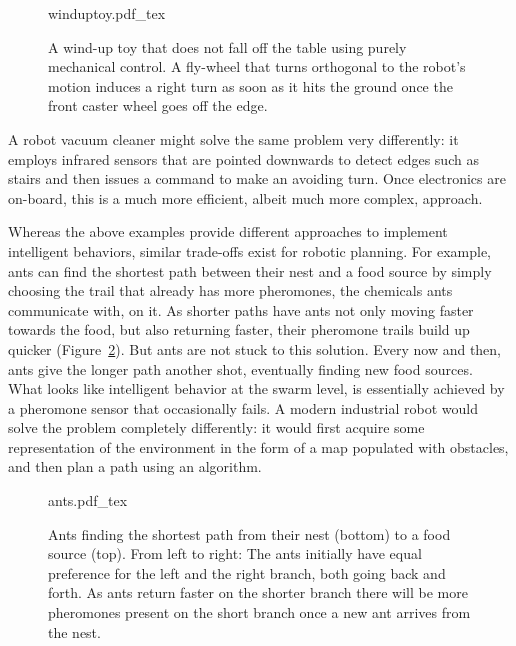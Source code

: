 \begin{figure}
    \centering
    \def\svgwidth{\textwidth}
    {winduptoy.pdf_tex}
    \caption{A wind-up toy that does not fall off the table using purely mechanical control. A fly-wheel that turns orthogonal to the robot's motion induces a right turn as soon as it hits the ground once the front caster wheel goes off the edge.}
    \label{fig:winduptoy}
\end{figure}

A robot vacuum cleaner might solve the same problem very differently: it employs infrared sensors that are pointed downwards to detect edges such as stairs and then issues a command to make an avoiding turn. Once electronics are on-board, this is a much more efficient, albeit much more complex, approach.

Whereas the above examples provide different approaches to implement intelligent behaviors, similar trade-offs exist for robotic planning. For example, ants can find the shortest path between their nest and a food source by simply choosing the trail that already has more pheromones, the chemicals ants communicate with, on it. As shorter paths have ants not only moving faster towards the food, but also returning faster, their pheromone trails build up quicker (Figure~\ref{fig:ants}). But ants are not stuck to this solution. Every now and then, ants give the longer path another shot, eventually finding new food sources. What looks like intelligent behavior at the swarm level, is essentially achieved by a pheromone sensor that occasionally fails. A modern industrial robot would solve the problem completely differently: it would first acquire some representation of the environment in the form of a map populated with obstacles, and then plan a path using an algorithm.

\begin{figure}
    \centering
    \def\svgwidth{\textwidth}
    {ants.pdf_tex}
    \caption{Ants finding the shortest path from their nest (bottom) to a food source (top). From left to right: The ants initially have equal preference for the left and the right branch, both going back and forth. As ants return faster on the shorter branch there will be more pheromones present on the short branch once a new ant arrives from the nest.}
    \label{fig:ants}
\end{figure}

